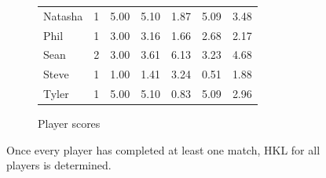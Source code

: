 \documentclass[letterpaper, 10 pt, conference]{ieeeconf}  %
\begin{document}
\begin{figure}[h!b]
\begin{subfigure}[hb]{0.4\textwidth}
\begin{tabular}{lccc|ccc}
                        Natasha	& 1	& 5.00  & 5.10 & 1.87 & 5.09 & 3.48 \\
                        Phil	& 1	& 3.00	& 3.16 & 1.66 & 2.68 & 2.17 \\
                        Sean	& 2	& 3.00	& 3.61 & 6.13 & 3.23 & 4.68 \\
                        Steve	& 1	& 1.00 	& 1.41 & 3.24 & 0.51 & 1.88 \\
                        Tyler	& 1	& 5.00  & 5.10 & 0.83 & 5.09 & 2.96 \\
                        \bottomrule
                \end{tabular}
                \caption{Player scores}
        \end{subfigure}
        \caption{Once every player has completed at least one match, HKL for all 
                 players is determined.}
\end{figure}
\clearpage
\end{document}
